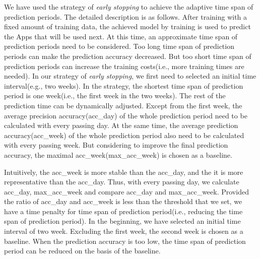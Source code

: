 We have used the strategy of \emph{early stopping} to achieve the adaptive time span of prediction periods. The detailed description is as follows. After training with a fixed amount of training data, the achieved model by training is used to predict the Apps that will be used next. At this time, an approximate time span of prediction periods need to be considered. Too long time span of prediction periods can make the prediction accuracy decreased. But too short time span of prediction periods can increase the training costs(i.e., more training times are needed). In our strategy of \emph{early stopping}, we first need to selected an initial time interval(e.g., two weeks). In the strategy, the shortest time span of prediction period is one week(i.e., the first week in the two weeks). The rest of the prediction time can be dynamically adjusted. Except from the first week, the average precision accuracy(acc\_day) of the whole prediction period need to be calculated with every passing day. At the same time, the average prediction accuracy(acc\_week) of the whole prediction period also need to be calculated with every passing week. But considering to improve the final prediction accuracy, the maximal acc\_week(max\_acc\_week) is chosen as a baseline.


Intuitively, the acc\_week is more stable than the acc\_day, and the it is more representative than the acc\_day. Thus, with every passing day, we calculate acc\_day, max\_acc\_week and compare acc\_day and max\_acc\_week. Provided the ratio of acc\_day and acc\_week is less than the threshold that we set, we have a time penalty for time span of prediction period(i.e., reducing the time span of prediction period). In the beginning, we have selected an initial time interval of two week. Excluding the first week, the second week is chosen as a baseline. When the prediction accuracy is too low, the time span of prediction period can be reduced on the basis of the baseline.


